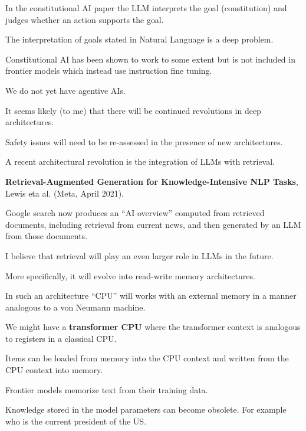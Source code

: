 {\vfill
In the constitutional AI paper the LLM interprets the goal (constitution) and judges whether an action supports the goal.



The interpretation of goals stated in Natural Language is a deep problem.

\vfill
Constitutional AI has been shown to work to some extent but is not included in frontier models which instead use instruction fine tuning.


We do not yet have agentive AIs.

\vfill
It seems likely (to me) that there will be continued revolutions in deep architectures.

\vfill
Safety issues will need to be re-assessed in the presence of new architectures.


A recent architectural revolution is the integration of LLMs with retrieval.

\vfill
{\bf Retrieval-Augmented Generation for Knowledge-Intensive NLP Tasks}, Lewis eta al. (Meta, April 2021).

\vfill
Google search now produces an ``AI overview'' computed from retrieved documents, including retrieval from current news,
and then generated by an LLM from those documents.


I believe that retrieval will play an even larger role in LLMs in the future.

\vfill
More specifically, it will evolve into read-write memory architectures.

\vfill
In such an architecture ``CPU'' will works with an external memory in a manner analogous to a von Neumann machine.

\vfill
We might have a {\bf transformer CPU} where the transformer context is analogous to registers in a classical CPU.

\vfill
Items can be loaded from memory into the CPU context and written from the CPU context into memory.


Frontier models memorize text from their training data.

\vfill
Knowledge stored in the model parameters can become obsolete.  For example who is the current president of the US.

}
